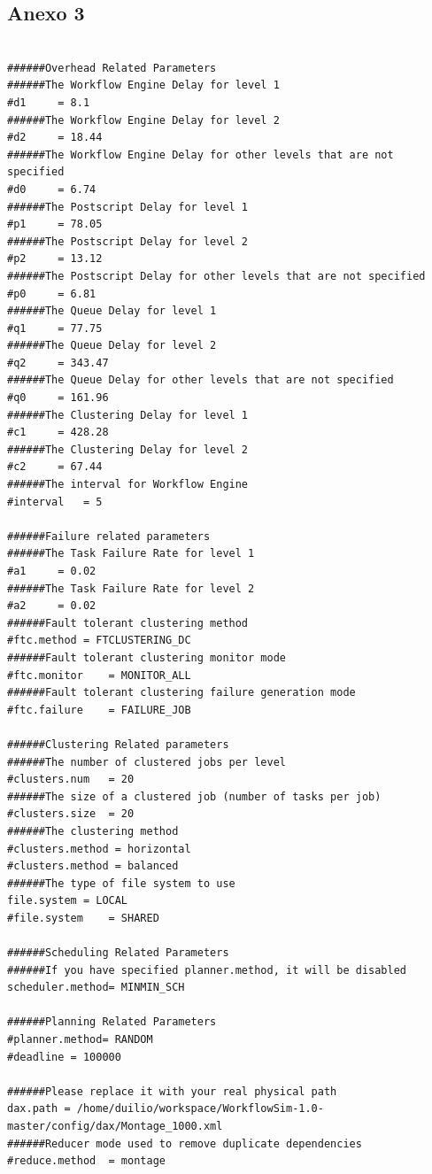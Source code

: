 \subsection{Anexo 3}
\begin{lstlisting}[caption=Descricão de uma ambiente computacional no WorkflowSim]

######Overhead Related Parameters
######The Workflow Engine Delay for level 1
#d1		= 8.1 
######The Workflow Engine Delay for level 2
#d2		= 18.44 
######The Workflow Engine Delay for other levels that are not specified 
#d0		= 6.74
######The Postscript Delay for level 1
#p1		= 78.05
######The Postscript Delay for level 2
#p2		= 13.12
######The Postscript Delay for other levels that are not specified
#p0		= 6.81
######The Queue Delay for level 1
#q1		= 77.75
######The Queue Delay for level 2
#q2		= 343.47
######The Queue Delay for other levels that are not specified
#q0		= 161.96
######The Clustering Delay for level 1
#c1		= 428.28
######The Clustering Delay for level 2
#c2		= 67.44
######The interval for Workflow Engine
#interval	= 5

######Failure related parameters
######The Task Failure Rate for level 1
#a1		= 0.02
######The Task Failure Rate for level 2
#a2		= 0.02
######Fault tolerant clustering method
#ftc.method	= FTCLUSTERING_DC
######Fault tolerant clustering monitor mode
#ftc.monitor	= MONITOR_ALL
######Fault tolerant clustering failure generation mode
#ftc.failure	= FAILURE_JOB

######Clustering Related parameters
######The number of clustered jobs per level
#clusters.num 	= 20
######The size of a clustered job (number of tasks per job)
#clusters.size 	= 20
######The clustering method
#clusters.method = horizontal
#clusters.method = balanced
######The type of file system to use
file.system	= LOCAL
#file.system	= SHARED

######Scheduling Related Parameters
######If you have specified planner.method, it will be disabled
scheduler.method= MINMIN_SCH

######Planning Related Parameters
#planner.method= RANDOM
#deadline = 100000

######Please replace it with your real physical path
dax.path = /home/duilio/workspace/WorkflowSim-1.0-master/config/dax/Montage_1000.xml
######Reducer mode used to remove duplicate dependencies
#reduce.method	= montage
\end{lstlisting}
\label{configworkflowsim}